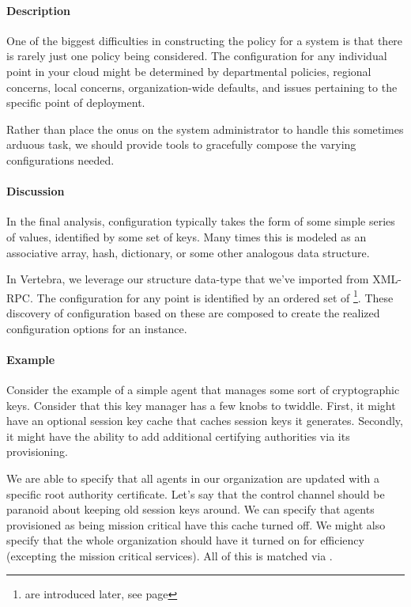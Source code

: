 \paragraph{Description}

One of the biggest difficulties in constructing the policy for a system is that there is rarely just one policy being considered.  The configuration for any individual point in your cloud might be determined by departmental policies, regional concerns, local concerns, organization-wide defaults, and issues pertaining to the specific point of deployment.

Rather than place the onus on the system administrator to handle this sometimes arduous task, we should provide tools to gracefully compose the varying configurations needed.

\paragraph{Discussion}

In the final analysis, configuration typically takes the form of some simple series of values, identified by some set of keys.  Many times this is modeled as an associative array, hash, dictionary, or some other analogous data structure.

In Vertebra, we leverage our structure data-type that we've imported from XML-RPC.  The configuration for any point is identified by an ordered set of \resources{}\footnote{\resources{} are introduced later, see page \pageref{ref:define-resource}}.  These discovery of configuration based on these \resources{} are composed to create the realized configuration options for an instance.

\paragraph{Example}

Consider the example of a simple agent that manages some sort of cryptographic keys.  Consider that this key manager has a few knobs to twiddle.  First, it might have an optional session key cache that caches session keys it generates.  Secondly, it might have the ability to add additional certifying authorities via its provisioning.

We are able to specify that all agents in our organization are updated with a specific root authority certificate.  Let's say that the control channel should be paranoid about keeping old session keys around.  We can specify that agents provisioned as being mission critical have this cache turned off.  We might also specify that the whole organization should have it turned on for efficiency (excepting the mission critical services).  All of this is matched via \resources{}.

